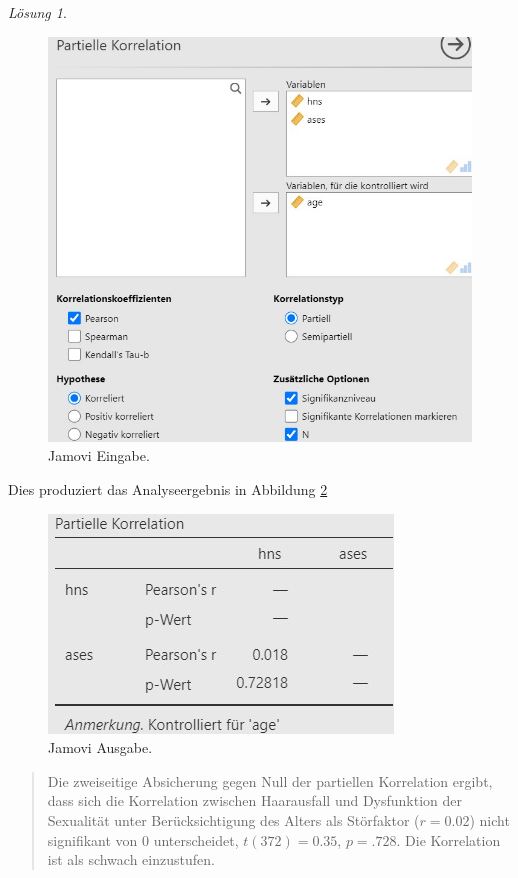 \documentclass[
]{book}
\theoremstyle{definition}
\theoremstyle{definition}
\theoremstyle{definition}
\theoremstyle{definition}
\theoremstyle{remark}
\newtheorem*{solution}{Lösung}
\begin{document}
\begin{solution}
\begin{figure}
\includegraphics[width=1\linewidth]{figures/08-exr-hairloss-sex-jmv-input-partiell} \caption{Jamovi Eingabe.}\label{fig:sol-hairloss-sex-input-partiell}
\end{figure}

Dies produziert das Analyseergebnis in Abbildung \ref{fig:sol-hairloss-sex-output-partiell}

\begin{figure}
\includegraphics[width=0.5\linewidth]{figures/08-exr-hairloss-sex-jmv-output-partiell} \caption{Jamovi Ausgabe.}\label{fig:sol-hairloss-sex-output-partiell}
\end{figure}

\begin{quote}
Die zweiseitige Absicherung gegen Null der partiellen Korrelation ergibt, dass sich die Korrelation zwischen Haarausfall und Dysfunktion der Sexualität unter Berücksichtigung des Alters als Störfaktor (\(r = 0.02\)) nicht signifikant von \(0\) unterscheidet, \(t(372) = 0.35\), \(p = .728\). Die Korrelation ist als schwach einzustufen.
\end{quote}

\end{solution}
\end{document}
